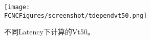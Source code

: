 \begin{figure}[H]
\centering
\texttt{[image: \\FCNCFigures/screenshot/tdependvt50.png]}
\caption{不同Latency下计算的Vt50。}
\label{fig:tdependvt50}
\end{figure}